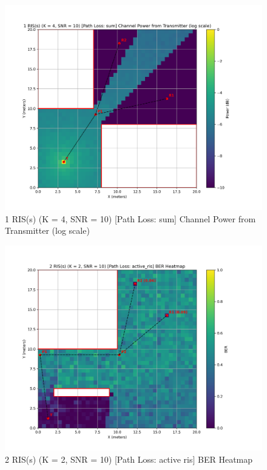 \begin{figure}[H]
  \centering
  \includegraphics[width=0.8\linewidth]{imgs/heatmap-simulations/1 RIS(s) (K = 4, SNR = 10) [Path Loss_ sum] Channel Power from Transmitter (log scale).png}
  \caption{1 RIS(s) (K = 4, SNR = 10) [Path Loss: sum] Channel Power from Transmitter (log scale)}
\end{figure}


\begin{figure}[H]
  \centering
  \includegraphics[width=0.8\linewidth]{imgs/heatmap-simulations/2 RIS(s) (K = 2, SNR = 10) [Path Loss_ active_ris] BER Heatmap.png}
  \caption{2 RIS(s) (K = 2, SNR = 10) [Path Loss: active ris] BER Heatmap}
\end{figure}

